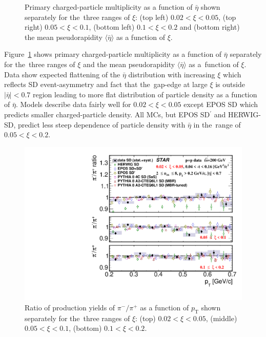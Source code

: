 \begin{figure}[h!]
	\caption{Primary charged-particle multiplicity as a function of $\bar{\eta}$ shown  separately for the~three ranges of  $\xi$: (top left) $0.02<\xi<0.05$, (top right) $0.05<\xi<0.1$, (bottom left) $0.1<\xi<0.2$ and (bottom right) the mean pseudorapidity  $\langle\bar{\eta}\rangle$ as a function of $\xi$.}
	\label{fig:results_star_eta}
\end{figure}

Figure~\ref{fig:results_star_eta} shows primary charged-particle multiplicity as a function of $\bar{\eta}$ %
 separately for the~three ranges of $\xi$ and the mean pseudorapidity $\langle \bar{\eta} \rangle$ as a~function of $\xi$. Data show expected flattening of the $\bar{\eta}$ distribution with increasing $\xi$ which reflects SD event-asymmetry and fact that the~gap-edge at large $\xi$ is outside $|\bar{\eta}|<0.7$ region leading to more flat distribution of particle density as a function of $\bar{\eta}$. Models describe data fairly well for $0.02<\xi<0.05$ except EPOS SD which predicts smaller charged-particle density. All MCs, but  EPOS SD$^\prime$ and HERWIG-SD, predict less steep dependence of particle density with $\bar{\eta}$ in the~range of $0.05 < \xi < 0.2$.



\begin{figure}[h!]
	\centering
	\includegraphics[width=.99\textwidth,page=1]{chapters/chrgSTAR/img/results/particleRatio_prt_0.pdf}
	\caption{Ratio of production yields of $\pi^-/\pi^+$ as a function of $p_\textrm{T}$ shown separately for the~three ranges of $\xi$: (top) $0.02<\xi<0.05$, (middle) $0.05<\xi<0.1$, (bottom) $0.1<\xi<0.2$.}
	\label{fig:results_star_pion}
	
\end{figure}


